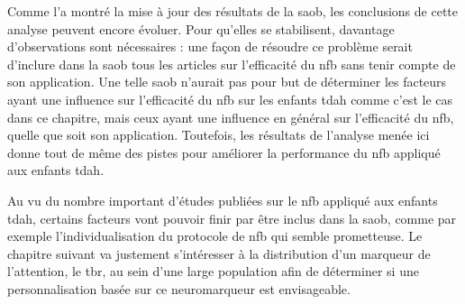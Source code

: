 Comme l'a montré la mise à jour des résultats de la \gls{saob}, les conclusions de cette analyse peuvent encore évoluer. Pour qu'elles se stabilisent, 
davantage d'observations sont nécessaires : une façon de résoudre ce problème serait d'inclure dans la \gls{saob} tous les articles sur l'efficacité du 
\gls{nfb} sans tenir compte de son application. Une telle \gls{saob} n'aurait pas pour but de déterminer les facteurs ayant une influence sur 
l'efficacité du \gls{nfb} sur les enfants \gls{tdah} comme c'est le cas dans ce chapitre, mais ceux ayant une influence en général sur 
l'efficacité du \gls{nfb}, quelle que soit son application. Toutefois, les résultats de l'analyse menée ici donne tout de même des pistes pour améliorer 
la performance du \gls{nfb} appliqué aux enfants \gls{tdah}. 

Au vu du nombre important d'études publiées sur le \gls{nfb} appliqué aux enfants \gls{tdah}, certains facteurs vont pouvoir finir par être inclus dans la \gls{saob}, comme par exemple 
l'individualisation du protocole de \gls{nfb} qui semble prometteuse. Le chapitre suivant va justement s'intéresser à la distribution d'un marqueur de l'attention, 
le \gls{tbr}, au sein d'une large population afin de déterminer si une personnalisation basée sur ce neuromarqueur est envisageable.




 
